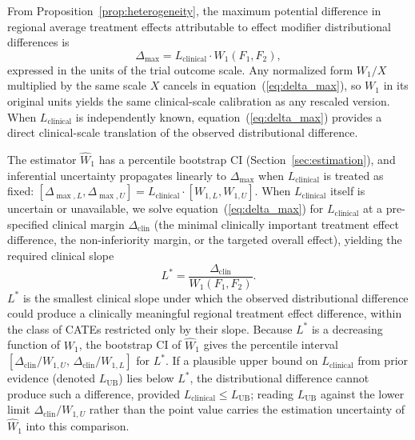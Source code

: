 \documentclass[AMA,Times1COL]{WileyNJDv5}
\begin{document}
From Proposition~\ref{prop:heterogeneity}, the maximum potential difference in regional average treatment effects attributable to effect modifier distributional differences is
\begin{equation}
\Delta_{\max} = L_{\text{clinical}} \cdot W_1(F_1, F_2),
\label{eq:delta_max}
\end{equation}
expressed in the units of the trial outcome scale. Any normalized form $W_1 / X$ multiplied by the same scale $X$ cancels in equation~(\ref{eq:delta_max}), so $W_1$ in its original units yields the same clinical-scale calibration as any rescaled version. When $L_{\text{clinical}}$ is independently known, equation~(\ref{eq:delta_max}) provides a direct clinical-scale translation of the observed distributional difference.

The estimator $\widehat{W}_1$ has a percentile bootstrap CI (Section~\ref{sec:estimation}), and inferential uncertainty propagates linearly to $\Delta_{\max}$ when $L_{\text{clinical}}$ is treated as fixed: $[\Delta_{\max,L}, \Delta_{\max,U}] = L_{\text{clinical}} \cdot [W_{1,L}, W_{1,U}]$. When $L_{\text{clinical}}$ itself is uncertain or unavailable, we solve equation~(\ref{eq:delta_max}) for $L_{\text{clinical}}$ at a pre-specified clinical margin $\Delta_{\text{clin}}$ (the minimal clinically important treatment effect difference, the non-inferiority margin, or the targeted overall effect), yielding the required clinical slope
\begin{equation}
L^* = \frac{\Delta_{\text{clin}}}{W_1(F_1, F_2)}.
\label{eq:lstar}
\end{equation}
$L^*$ is the smallest clinical slope under which the observed distributional difference could produce a clinically meaningful regional treatment effect difference, within the class of CATEs restricted only by their slope. Because $L^*$ is a decreasing function of $W_1$, the bootstrap CI of $\widehat{W}_1$ gives the percentile interval $[\Delta_{\text{clin}}/W_{1,U},\, \Delta_{\text{clin}}/W_{1,L}]$ for $L^*$. If a plausible upper bound on $L_{\text{clinical}}$ from prior evidence (denoted $L_{\text{UB}}$) lies below $L^*$, the distributional difference cannot produce such a difference, provided $L_{\text{clinical}} \leq L_{\text{UB}}$; reading $L_{\text{UB}}$ against the lower limit $\Delta_{\text{clin}}/W_{1,U}$ rather than the point value carries the estimation uncertainty of $\widehat{W}_1$ into this comparison. 
\end{document}
